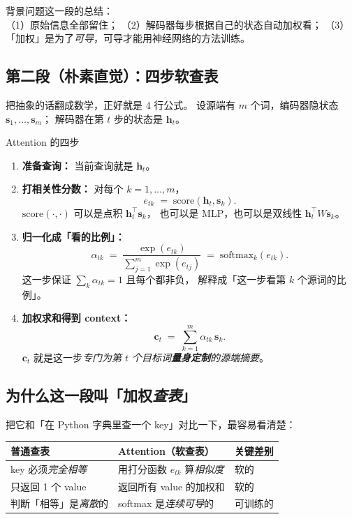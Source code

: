 \documentclass[11pt,a4paper]{ctexart}
\newcommand{\vect}[1]{\boldsymbol{#1}}
\newcommand{\softmax}{\mathrm{softmax}}
\begin{document}
\begin{keypointblock}
背景问题这一段的总结：\\
（1）原始信息全部留住；
（2）解码器每步根据自己的状态自动加权看；
（3）「加权」是为了\emph{可导}，可导才能用神经网络的方法训练。
\end{keypointblock}

\subsection{第二段（朴素直觉）：四步软查表}

把抽象的话翻成数学，正好就是 4 行公式。
设源端有 $m$ 个词，编码器隐状态 $\vect{s}_1, \dots, \vect{s}_m$；
解码器在第 $t$ 步的状态是 $\vect{h}_t$。

\begin{mathbox}{Attention 的四步}
\begin{enumerate}
  \item \textbf{准备查询：} 当前查询就是 $\vect{h}_t$。
  \item \textbf{打相关性分数：} 对每个 $k = 1, \dots, m$，
  \[
    e_{tk} \;=\; \mathrm{score}(\vect{h}_t, \vect{s}_k).
  \]
  $\mathrm{score}(\cdot, \cdot)$ 可以是点积 $\vect{h}_t^\top \vect{s}_k$，
  也可以是 MLP，也可以是双线性 $\vect{h}_t^\top W \vect{s}_k$。
  \item \textbf{归一化成「看的比例」：}
  \[
    \alpha_{tk} \;=\;
    \frac{\exp(e_{tk})}{\sum_{j=1}^{m} \exp(e_{tj})}
    \;=\; \softmax_k(e_{tk}).
  \]
  这一步保证 $\sum_k \alpha_{tk} = 1$ 且每个都非负，
  解释成「这一步看第 $k$ 个源词的比例」。
  \item \textbf{加权求和得到 context：}
  \[
    \vect{c}_t \;=\; \sum_{k=1}^{m} \alpha_{tk}\,\vect{s}_k.
  \]
  $\vect{c}_t$ 就是这一步\emph{专门为第 $t$ 个目标词\textbf{量身定制}的源端摘要}。
\end{enumerate}
\end{mathbox}

\subsection{为什么这一段叫「加权\emph{查表}」}

把它和「在 Python 字典里查一个 key」对比一下，最容易看清楚：

\begin{center}
\renewcommand{\arraystretch}{1.25}
\begin{tabular}{@{}p{4.5cm} p{4cm} p{5cm}@{}}
\toprule
普通查表 & Attention（软查表） & 关键差别 \\
\midrule
key 必须\emph{完全相等}     & 用打分函数 $e_{tk}$ 算\emph{相似度} & 软的 \\
只返回 1 个 value           & 返回所有 value 的加权和              & 软的 \\
判断「相等」是\emph{离散}的 & softmax 是\emph{连续可导}的         & 可训练的 \\
\bottomrule
\end{tabular}
\end{center}
\end{document}
